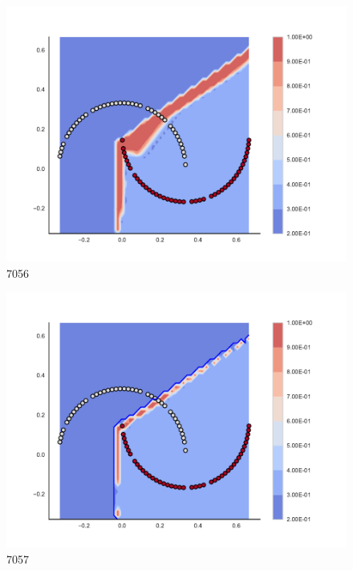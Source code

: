 \begin{subfigure}[b]{0.09\textwidth}
    \includegraphics[clip, trim=2.35cm 1.75cm 4.5cm 0cm,width=\textwidth]{img/convergence/7056.pdf}
    \caption{7056}
    \label{fig:convergence_7056}
\end{subfigure}
%
\begin{subfigure}[b]{0.09\textwidth}
    \includegraphics[clip, trim=2.35cm 1.75cm 4.5cm 0cm,width=\textwidth]{img/convergence/7057.pdf}
    \caption{7057}
    \label{fig:convergence_7057}
\end{subfigure}
%
